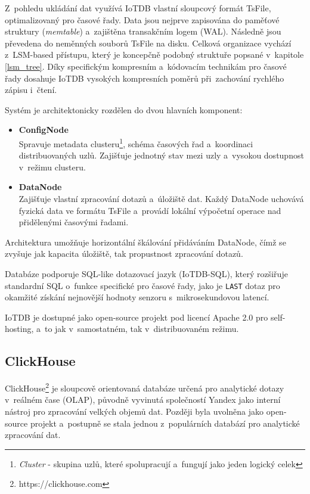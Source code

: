 Z~pohledu ukládání dat využívá IoTDB vlastní sloupcový formát TsFile, optimalizovaný pro časové řady. 
Data jsou nejprve zapisována do paměťové struktury (\textit{memtable}) a~zajištěna transakčním logem (WAL). 
Následně jsou převedena do neměnných souborů TsFile na disku. 
Celková organizace vychází z~LSM-based přístupu, který je koncepčně podobný struktuře popsané v~kapitole \ref{lsm_tree}. 
Díky specifickým kompresním a~kódovacím technikám pro časové řady dosahuje IoTDB vysokých kompresních poměrů při~zachování rychlého zápisu i~čtení. 
\cite{iotdbdocs}

Systém je architektonicky rozdělen do dvou hlavních komponent:

\begin{itemize}
    \item \textbf{ConfigNode} \\
    Spravuje metadata clusteru\footnote{\textit{Cluster} - skupina uzlů, které spolupracují a~fungují jako jeden logický celek}, schéma časových řad a~koordinaci distribuovaných uzlů. 
    Zajišťuje jednotný stav mezi uzly a~vysokou dostupnost v~režimu clusteru.
    
    \item \textbf{DataNode} \\
    Zajišťuje vlastní zpracování dotazů a~úložiště dat. 
    Každý DataNode uchovává fyzická data ve formátu TsFile a~provádí lokální výpočetní operace nad přidělenými časovými řadami.
\end{itemize}

Architektura umožňuje horizontální škálování přidáváním DataNode, čímž se zvyšuje jak kapacita úložiště, tak propustnost zpracování dotazů.

Databáze podporuje SQL-like dotazovací jazyk (IoTDB-SQL), který rozšiřuje standardní SQL o~funkce specifické pro časové řady, jako je \texttt{LAST} dotaz pro okamžité získání nejnovější hodnoty senzoru s~mikrosekundovou latencí. 

IoTDB je dostupné jako open-source projekt pod licencí Apache 2.0 pro self-hosting, a~to jak v~samostatném, tak v~distribuovaném režimu. 

\subsection{ClickHouse}

ClickHouse\footnote{https://clickhouse.com} je sloupcově orientovaná databáze určená pro analytické dotazy v~reálném čase (OLAP), původně vyvinutá společností Yandex jako interní nástroj pro zpracování velkých objemů dat. 
Později byla uvolněna jako open-source projekt a~postupně se stala jednou z~populárních databází pro analytické zpracování dat. \cite{clickhouseintro}

